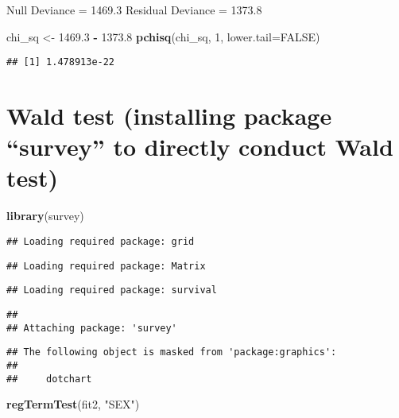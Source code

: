 \documentclass[]{article}
\newenvironment{Shaded}{\begin{snugshade}}{\end{snugshade}}
\newcommand{\KeywordTok}[1]{\textcolor[rgb]{0.13,0.29,0.53}{\textbf{#1}}}
\newcommand{\DataTypeTok}[1]{\textcolor[rgb]{0.13,0.29,0.53}{#1}}
\newcommand{\DecValTok}[1]{\textcolor[rgb]{0.00,0.00,0.81}{#1}}
\newcommand{\FloatTok}[1]{\textcolor[rgb]{0.00,0.00,0.81}{#1}}
\newcommand{\StringTok}[1]{\textcolor[rgb]{0.31,0.60,0.02}{#1}}
\newcommand{\OtherTok}[1]{\textcolor[rgb]{0.56,0.35,0.01}{#1}}
\newcommand{\OperatorTok}[1]{\textcolor[rgb]{0.81,0.36,0.00}{\textbf{#1}}}
\newcommand{\NormalTok}[1]{#1}
\begin{document}
Null Deviance = 1469.3 Residual Deviance = 1373.8

\begin{Shaded}
\begin{Highlighting}[]
\NormalTok{chi_sq <-}\StringTok{ }\FloatTok{1469.3} \OperatorTok{-}\StringTok{ }\FloatTok{1373.8}
\KeywordTok{pchisq}\NormalTok{(chi_sq, }\DecValTok{1}\NormalTok{, }\DataTypeTok{lower.tail=}\OtherTok{FALSE}\NormalTok{)}
\end{Highlighting}
\end{Shaded}

\begin{verbatim}
## [1] 1.478913e-22
\end{verbatim}

\section{\texorpdfstring{Wald test (installing package ``survey'' to
directly conduct Wald
test)}{Wald test (installing package survey to directly conduct Wald test)}}\label{wald-test-installing-package-survey-to-directly-conduct-wald-test}

\begin{Shaded}
\begin{Highlighting}[]
\KeywordTok{library}\NormalTok{(survey)}
\end{Highlighting}
\end{Shaded}

\begin{verbatim}
## Loading required package: grid
\end{verbatim}

\begin{verbatim}
## Loading required package: Matrix
\end{verbatim}

\begin{verbatim}
## Loading required package: survival
\end{verbatim}

\begin{verbatim}
## 
## Attaching package: 'survey'
\end{verbatim}

\begin{verbatim}
## The following object is masked from 'package:graphics':
## 
##     dotchart
\end{verbatim}

\begin{Shaded}
\begin{Highlighting}[]
\KeywordTok{regTermTest}\NormalTok{(fit2, }\StringTok{"SEX"}\NormalTok{)}
\end{Highlighting}
\end{Shaded}
\end{document}
